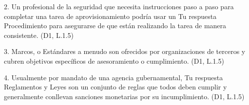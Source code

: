 2. Un profesional de la seguridad que necesita instrucciones paso a paso para completar una tarea de aprovisionamiento podría usar un Tu respuesta 
Procedimiento
para asegurarse de que están realizando la tarea de manera consistente. (D1, L.1.5)

3. Marcos, o
Estándares
a menudo son ofrecidos por organizaciones de terceros y cubren objetivos específicos de asesoramiento o cumplimiento. (D1, L.1.5)

4. Usualmente por mandato de una agencia gubernamental, Tu respuesta 
Reglamentos y Leyes
son un conjunto de reglas que todos deben cumplir y generalmente conllevan sanciones monetarias por su incumplimiento. (D1, L.1.5)



\begin{comment}
    capítulo IV
Pregunta 1		1 / 1 punto
Está trabajando en la oficina de seguridad de su organización. Recibe una llamada de un usuario que ha intentado iniciar sesión en la red varias veces con las credenciales correctas, sin éxito. Este es un ejemplo de un(a)_______. (D2, L2.1.1)

Opciones de preguntas:

A) 

Emergencia


B) 

Evento


C) 

Política


D) 

Desastre


Ocultar 1 comentarios sobre preguntas
Correcto. El usuario informó que ocurrió algo medible; en este punto, no está claro si se trata de una ocurrencia normal o algo que presenta un impacto adverso, por lo que la mejor descripción es evento.

Pregunta 2		1 / 1 punto
Está trabajando en la oficina de seguridad de su organización. Recibe una llamada de un usuario que intentó iniciar sesión en la red varias veces con las credenciales correctas, sin éxito. Después de una breve investigación, determina que la cuenta del usuario se ha visto comprometida. Este es un ejemplo de un(a)_______. (D2, L2.1.1)

Opciones de preguntas:

A) 

Gestión de riesgos


B) 

Detección de incidentes


C) 


\end{comment}

